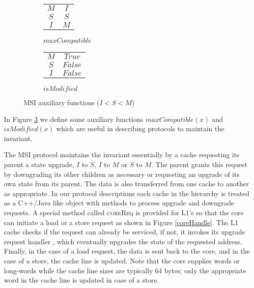 \begin{figure}
\begin{subfigure}{.4\linewidth}
\centering
\begin{tabular}{|c|c|}
\hline
$M$ & $I$\\
$S$ & $S$\\
$I$ & $M$\\
\hline
\end{tabular}
\caption{$maxCompatible$}
\label{toCompat}
\end{subfigure}
\begin{subfigure}{.4\linewidth}
\centering
\begin{tabular}{|c|c|}
\hline
$M$ & $True$\\
$S$ & $False$\\
$I$ & $False$\\
\hline
\end{tabular}
\caption{$isModified$}
\label{isModified}
\end{subfigure}
\caption{MSI auxiliary functions ($I < S < M$)}
\label{funcs}
\end{figure}
In Figure \ref{funcs} we define some auxiliary functions $maxCompatible(x)$ and $isModified(x)$ which are useful in describing protocols to maintain the invariant.

The MSI protocol maintains the invariant essentially by a cache requesting its parent a state upgrade, \ie $I$ to $S$, $I$ to $M$ or $S$ to $M$. The parent grants this request by downgrading its other children as necessary or requesting an upgrade of its own state from its parent. The data is also transferred from one cache to another as appropriate. In our protocol descriptions each cache in the hierarchy is treated as a C++/Java like object with methods to process upgrade and downgrade requests. A special method called \textsc{coreReq} is provided for L1's so that the core can initiate a load or a store request as shown in Figure \ref{coreHandle}. The L1 cache checks if the request
can already be serviced, if not, it invokes its upgrade request handler \uReq{},
which eventually upgrades the state of the requested address. Finally, in the case 
of a load request, the data is sent back to the core, and in the case of a store, the
cache line is updated. Note that the core supplies words or long-words while the
cache line sizes are typically 64 bytes; only the appropriate word in the cache
line is updated in case of a store.



